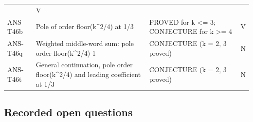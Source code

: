 \documentclass[
  11pt,
]{article}
\begin{document}
\begin{longtable}[]{@{}llll@{}}
\begin{minipage}[t]{0.22\columnwidth}
\end{minipage} & \begin{minipage}[t]{0.10\columnwidth}\raggedright
V\strut
\end{minipage}\tabularnewline
\begin{minipage}[t]{0.16\columnwidth}\raggedright
ANS-T46b\strut
\end{minipage} & \begin{minipage}[t]{0.41\columnwidth}\raggedright
Pole of order floor(k\^{}2/4) at 1/3\strut
\end{minipage} & \begin{minipage}[t]{0.22\columnwidth}\raggedright
PROVED for k \textless= 3; CONJECTURE for k \textgreater= 4\strut
\end{minipage} & \begin{minipage}[t]{0.10\columnwidth}\raggedright
V\strut
\end{minipage}\tabularnewline
\begin{minipage}[t]{0.16\columnwidth}\raggedright
ANS-T46q\strut
\end{minipage} & \begin{minipage}[t]{0.41\columnwidth}\raggedright
Weighted middle-word sum: pole order floor(k\^{}2/4)-1\strut
\end{minipage} & \begin{minipage}[t]{0.22\columnwidth}\raggedright
CONJECTURE (k = 2, 3 proved)\strut
\end{minipage} & \begin{minipage}[t]{0.10\columnwidth}\raggedright
N\strut
\end{minipage}\tabularnewline
\begin{minipage}[t]{0.16\columnwidth}\raggedright
ANS-T46t\strut
\end{minipage} & \begin{minipage}[t]{0.41\columnwidth}\raggedright
General continuation, pole order floor(k\^{}2/4) and leading coefficient
at 1/3\strut
\end{minipage} & \begin{minipage}[t]{0.22\columnwidth}\raggedright
CONJECTURE (k = 2, 3 proved)\strut
\end{minipage} & \begin{minipage}[t]{0.10\columnwidth}\raggedright
N\strut
\end{minipage}\tabularnewline
\bottomrule
\end{longtable}

\hypertarget{recorded-open-questions-6}{%
\subsection{Recorded open questions}\label{recorded-open-questions-6}}
\end{document}
